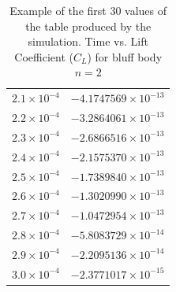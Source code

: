 \begin{table}[H]
\begin{tabular}{|c|c|}
		$2.1 \times 10^{-4}$ & $-4.1747569 \times 10^{-13}$ \\
		$2.2 \times 10^{-4}$ & $-3.2864061 \times 10^{-13}$ \\
		$2.3 \times 10^{-4}$ & $-2.6866516 \times 10^{-13}$ \\
		$2.4 \times 10^{-4}$ & $-2.1575370 \times 10^{-13}$ \\
		$2.5 \times 10^{-4}$ & $-1.7389840 \times 10^{-13}$ \\
		$2.6 \times 10^{-4}$ & $-1.3020990 \times 10^{-13}$ \\
		$2.7 \times 10^{-4}$ & $-1.0472954 \times 10^{-13}$ \\
		$2.8 \times 10^{-4}$ & $-5.8083729 \times 10^{-14}$ \\
		$2.9 \times 10^{-4}$ & $-2.2095136 \times 10^{-14}$ \\
		$3.0 \times 10^{-4}$ & $-2.3771017 \times 10^{-15}$ \\
		\hline
	\end{tabular}
	\label{tab:1FaceClTable}
	\caption{Example of the first 30 values of the table produced by the simulation. Time vs. Lift Coefficient ($C_L$) for bluff body $n=2$}
\end{table}

